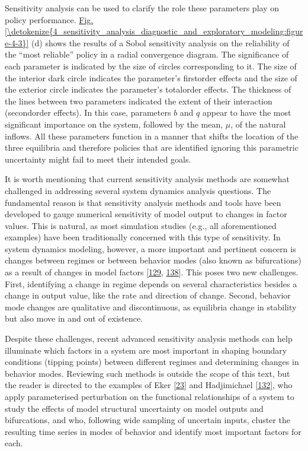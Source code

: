 \documentclass[letterpaper,10pt,english]{sphinxmanual}
\begin{document}
\sphinxAtStartPar
Sensitivity analysis can be used to clarify the role these parameters play on policy performance. \hyperref[\detokenize{4_sensitivity_analysis_diagnostic_and_exploratory_modeling:figure-4-3}]{Fig.\@ \ref{\detokenize{4_sensitivity_analysis_diagnostic_and_exploratory_modeling:figure-4-3}}} (d) shows the results of a Sobol sensitivity analysis on the reliability of the “most reliable” policy in a radial convergence diagram. The significance of each parameter is indicated by the size of circles corresponding to it. The size of the interior dark circle indicates the parameter’s first\sphinxhyphen{}order effects and the size of the exterior circle indicates the parameter’s total\sphinxhyphen{}order effects. The thickness of the lines between two parameters indicated the extent of their interaction (second\sphinxhyphen{}order effects). In this case, parameters \(b\) and \(q\) appear to have the most significant importance on the system, followed by the mean, \(\mu\), of the natural inflows. All these parameters function in a manner that shifts the location of the three equilibria and therefore policies that are identified ignoring this parametric uncertainty might fail to meet their intended goals.

\sphinxAtStartPar
It is worth mentioning that current sensitivity analysis methods are somewhat challenged in addressing several system dynamics analysis questions. The fundamental reason is that sensitivity analysis methods and tools have been developed to gauge numerical sensitivity of model output to changes in factor values. This is natural, as most simulation studies (e.g., all aforementioned examples) have been traditionally concerned with this type of sensitivity. In system dynamics modeling, however, a more important and pertinent concern is changes between regimes or between behavior modes (also known as bifurcations) as a result of changes in model factors {[}\hyperlink{cite.index:id57}{129}, \hyperlink{cite.index:id63}{138}{]}. This poses two new challenges. First, identifying a change in regime depends on several characteristics besides a change in output value, like the rate and direction of change. Second, behavior mode changes are qualitative and discontinuous, as equilibria change in stability but also move in and out of existence.

\sphinxAtStartPar
Despite these challenges, recent advanced sensitivity analysis methods can help illuminate which factors in a system are most important in shaping boundary conditions (tipping points) between different regimes and determining changes in behavior modes. Reviewing such methods is outside the scope of this text, but the reader is directed to the examples of Eker  {[}\hyperlink{cite.index:id64}{23}{]} and Hadjimichael  {[}\hyperlink{cite.index:id60}{132}{]}, who apply parameterised perturbation on the functional relationships of a system to study the effects of model structural uncertainty on model outputs and bifurcations, and  who, following wide sampling of uncertain inputs, cluster the resulting time series in modes of behavior and identify most important factors for each.
\end{document}
